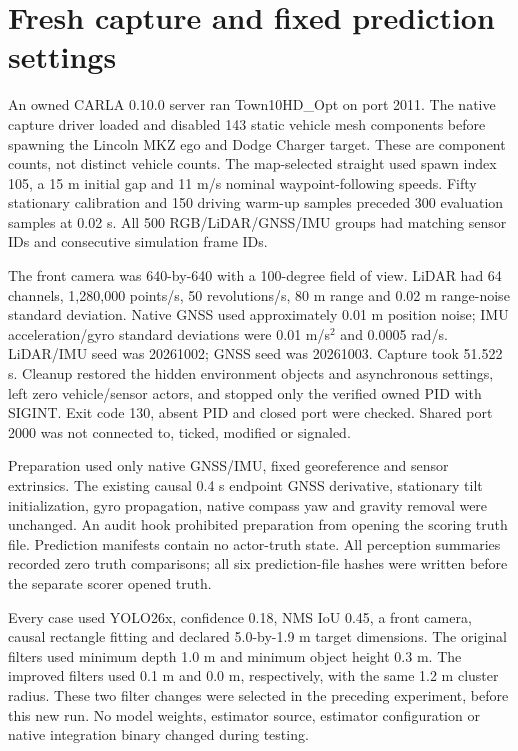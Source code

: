 \documentclass[11pt]{article}
\begin{document}
\section{Fresh capture and fixed prediction settings}
An owned CARLA 0.10.0 server ran Town10HD\_Opt on port 2011. The native
capture driver loaded  and disabled
143 static vehicle mesh components before spawning the Lincoln MKZ ego and
Dodge Charger target. These are component counts, not distinct vehicle counts.
The map-selected straight used spawn index 105, a 15 m initial gap and
11 m/s nominal waypoint-following speeds. Fifty stationary calibration and
150 driving warm-up samples preceded 300 evaluation samples at 0.02 s.
All 500 RGB/LiDAR/GNSS/IMU groups had matching sensor IDs and consecutive
simulation frame IDs.

The front camera was 640-by-640 with a 100-degree field of view. LiDAR had
64 channels, 1,280,000 points/s, 50 revolutions/s, 80 m range and 0.02 m
range-noise standard deviation. Native GNSS used approximately 0.01 m
position noise; IMU acceleration/gyro standard deviations were 0.01 m/s$^2$
and 0.0005 rad/s. LiDAR/IMU seed was 20261002; GNSS seed was 20261003.
Capture took 51.522 s. Cleanup restored the hidden environment
objects and asynchronous settings, left zero vehicle/sensor actors, and
stopped only the verified owned PID with SIGINT. Exit code 130, absent PID
and closed port were checked. Shared port 2000 was not connected to, ticked,
modified or signaled.

Preparation used only native GNSS/IMU, fixed georeference and sensor
extrinsics. The existing causal 0.4 s endpoint GNSS derivative, stationary
tilt initialization, gyro propagation, native compass yaw and gravity removal
were unchanged. An audit hook prohibited preparation from opening the scoring
truth file. Prediction manifests contain no actor-truth state. All perception
summaries recorded zero truth comparisons; all six prediction-file hashes
were written before the separate scorer opened truth.

Every case used YOLO26x, confidence 0.18, NMS IoU 0.45, a front camera,
causal rectangle fitting and declared 5.0-by-1.9 m target dimensions.
The original filters used minimum depth 1.0 m and minimum object height
0.3 m. The improved filters used 0.1 m and 0.0 m, respectively, with the
same 1.2 m cluster radius. These two filter changes were selected in the
preceding experiment, before this new run. No model weights, estimator source,
estimator configuration or native integration binary changed during testing.
\end{document}
